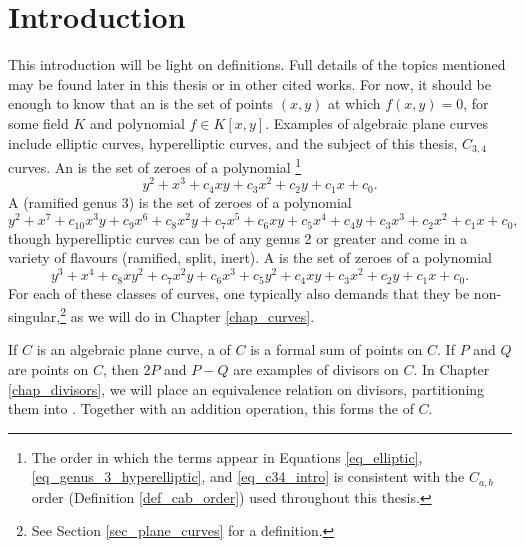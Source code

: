 

\section{Introduction}

This introduction will be light on definitions.
Full details of the topics mentioned may be found later in this thesis or in other cited works.
For now, it should be enough to know that an  is the set of points $(x,y)$
at which $f(x, y) = 0$, for some field $K$ and polynomial $f \in K[x,y]$.
Examples of algebraic plane curves include elliptic curves, hyperelliptic curves,
and the subject of this thesis, $C_{3,4}$ curves.
An  is the set of zeroes of a polynomial
\footnote{The order in which the terms appear in Equations
\ref{eq_elliptic}, \ref{eq_genus_3_hyperelliptic}, and \ref{eq_c34_intro}
is consistent with the $C_{a,b}$ order (Definition \ref{def_cab_order}) used throughout this thesis.}
\begin{equation}
  \label{eq_elliptic}
  y^2 + x^3 + c_4xy + c_3x^2 + c_2y + c_1x + c_0.
\end{equation}
A (ramified genus 3)  is the set of zeroes of a polynomial
\begin{equation}
  \label{eq_genus_3_hyperelliptic}
  y^2 + x^7 + c_{10}x^3y + c_9x^6 + c_8x^2y + c_7x^5 + c_6xy + c_5x^4 + c_4y + c_3x^3 + c_2x^2 + c_1x + c_0,
\end{equation}
though hyperelliptic curves can be of any genus 2 or greater and come in a variety of flavours (ramified, split, inert).
A  is the set of zeroes of a polynomial
\begin{equation}
  \label{eq_c34_intro}
  y^3 + x^4 + c_8xy^2 + c_7x^2y + c_6x^3 + c_5y^2 + c_4xy + c_3x^2 + c_2y + c_1x + c_0.
\end{equation}
For each of these classes of curves, one typically also demands that they be non-singular,\footnote{
See Section \ref{sec_plane_curves} for a definition.}
as we will do in Chapter \ref{chap_curves}.

If $C$ is an algebraic plane curve, a  of $C$ is a formal sum of points on $C$.
If $P$ and $Q$ are points on $C$, then $2P$ and $P - Q$ are examples of divisors on $C$.
In Chapter \ref{chap_divisors}, we will place an equivalence relation on divisors,
partitioning them into .
Together with an addition operation, this forms the  of $C$.



